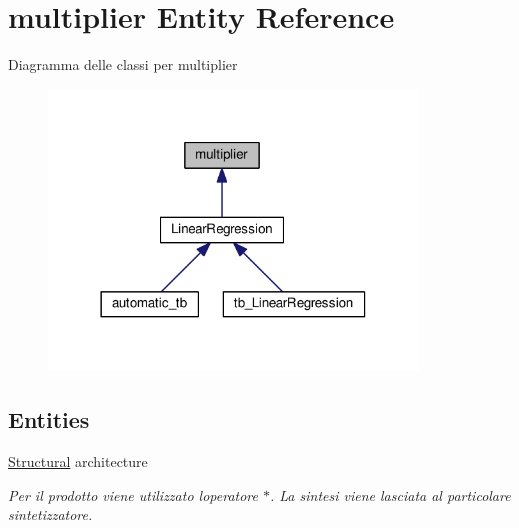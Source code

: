 \hypertarget{classmultiplier}{}\section{multiplier Entity Reference}
\label{classmultiplier}


Diagramma delle classi per multiplier\nopagebreak
\begin{figure}[H]
\begin{center}
\leavevmode
\includegraphics[width=278pt]{classmultiplier__inherit__graph}
\end{center}
\end{figure}
\subsection*{Entities}
\begin{DoxyCompactItemize}
\item 
\hyperlink{classmultiplier_1_1_structural}{Structural} architecture
\begin{DoxyCompactList}\small\item\em Per il prodotto viene utilizzato l\textquotesingle{}operatore $\ast$. La sintesi viene lasciata al particolare sintetizzatore. \end{DoxyCompactList}\end{DoxyCompactItemize}
